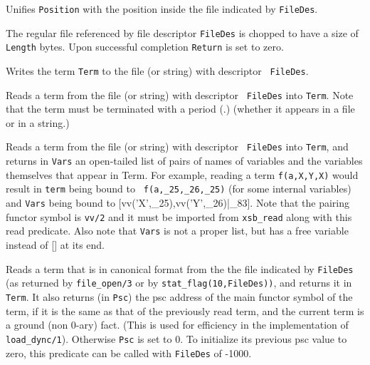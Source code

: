 \begin{description}
    Unifies {\tt Position} with the position inside the file indicated by
    {\tt FileDes}.

    The regular file  referenced by file descriptor {\tt FileDes}
    is chopped to have a size of {\tt Length} bytes. Upon successful
    completion {\tt Return} is set to zero.

    Writes the term {\tt Term} to the file (or string) with descriptor {\tt
    FileDes}.

    Reads a term from the file (or string) with descriptor {\tt
    FileDes} into {\tt Term}.  Note that the term must be terminated
    with a period (.) (whether it appears in a file or in a string.)

    Reads a term from the file (or string) with descriptor {\tt
    FileDes} into {\tt Term}, and returns in {\tt Vars} an open-tailed list of
    pairs of names of variables and the variables themselves that
    appear in Term.  For example, reading a term {\tt f(a,X,Y,X)}
    would result in {\tt term} being bound to {\tt
    f(a,\_25,\_26,\_25)} (for some internal variables) and {\tt Vars}
    being bound to {[vv('X',\_25),vv('Y',\_26)|\_83]}.  Note that the
    pairing functor symbol is {\tt vv/2} and it must be imported from
    {\tt xsb\_read} along with this read predicate.  Also note that 
    {\tt Vars} is not a proper list, but has a free variable instead 
    of [] at its end.

    Reads a term that is in canonical format from the the file
    indicated by {\tt FileDes} (as returned by {\tt file\_open/3} or
    by {\tt stat\_flag(10,FileDes))}, and returns it in {\tt Term}.
    It also returns (in {\tt Psc}) the psc address of the main functor
    symbol of the term, if it is the same as that of the previously
    read term, and the current term is a ground (non 0-ary) fact.
    (This is used for efficiency in the implementation of {\tt
    load\_dync/1}).  Otherwise {\tt Psc} is set to 0.  To initialize
    its previous psc value to zero, this predicate can be called with
    {\tt FileDes} of -1000.


\end{description}

